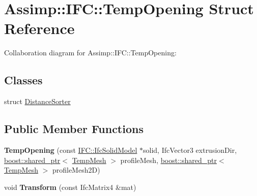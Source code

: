 \hypertarget{struct_assimp_1_1_i_f_c_1_1_temp_opening}{\section{Assimp\+:\+:I\+F\+C\+:\+:Temp\+Opening Struct Reference}
\label{struct_assimp_1_1_i_f_c_1_1_temp_opening}
}


Collaboration diagram for Assimp\+:\+:I\+F\+C\+:\+:Temp\+Opening\+:
\subsection*{Classes}
\begin{DoxyCompactItemize}
\item 
struct \hyperlink{struct_assimp_1_1_i_f_c_1_1_temp_opening_1_1_distance_sorter}{Distance\+Sorter}
\end{DoxyCompactItemize}
\subsection*{Public Member Functions}
\begin{DoxyCompactItemize}
\item 
\hypertarget{struct_assimp_1_1_i_f_c_1_1_temp_opening_a44bf9eeefc0adae8b5ebe85936ede53e}{{\bfseries Temp\+Opening} (const \hyperlink{struct_assimp_1_1_i_f_c_1_1_ifc_solid_model}{I\+F\+C\+::\+Ifc\+Solid\+Model} $\ast$solid, Ifc\+Vector3 extrusion\+Dir, \hyperlink{classboost_1_1shared__ptr}{boost\+::shared\+\_\+ptr}$<$ \hyperlink{struct_assimp_1_1_i_f_c_1_1_temp_mesh}{Temp\+Mesh} $>$ profile\+Mesh, \hyperlink{classboost_1_1shared__ptr}{boost\+::shared\+\_\+ptr}$<$ \hyperlink{struct_assimp_1_1_i_f_c_1_1_temp_mesh}{Temp\+Mesh} $>$ profile\+Mesh2\+D)}\label{struct_assimp_1_1_i_f_c_1_1_temp_opening_a44bf9eeefc0adae8b5ebe85936ede53e}

\item 
\hypertarget{struct_assimp_1_1_i_f_c_1_1_temp_opening_a00bd56d93cff73076190ef7ba499c3bb}{void {\bfseries Transform} (const Ifc\+Matrix4 \&mat)}\label{struct_assimp_1_1_i_f_c_1_1_temp_opening_a00bd56d93cff73076190ef7ba499c3bb}

\end{DoxyCompactItemize}
